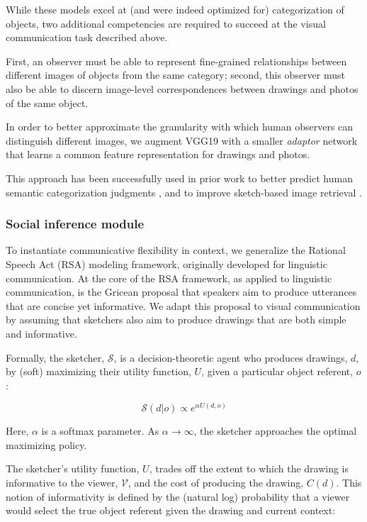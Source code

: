\documentclass[9pt,twocolumn,twoside]{pnas-new}
\begin{document}
While these models excel at (and were indeed optimized for) categorization of objects, two additional competencies are required to succeed at the visual communication task described above.

First, an observer must be able to represent fine-grained relationships between different images of objects from the same category; second, this observer must also be able to discern image-level correspondences between drawings and photos of the same object. 

In order to better approximate the granularity with which human observers can distinguish different images, we augment VGG19 with a smaller \textit{adaptor} network that learns a common feature representation for drawings and photos. 

This approach has been successfully used in prior work to better predict human semantic categorization judgments \cite{peterson2016adapting}, and to improve sketch-based image retrieval \cite[]{sangkloy2016sketchy}. 


\subsubsection*{Social inference module}

To instantiate communicative flexibility in context, we generalize the Rational Speech Act (RSA) modeling framework, originally developed for linguistic communication. At the core of the RSA framework, as applied to linguistic communication, is the Gricean proposal that speakers aim to produce utterances that are concise yet informative. We adapt this proposal to visual communication by assuming that sketchers also aim to produce drawings that are both simple and informative. 

Formally, the sketcher, $\mathcal{S}$, is a decision-theoretic agent who produces drawings, $d$, by (soft) maximizing their utility function, $U$, given a particular object referent, $o$: 

\begin{equation}
\mathcal{S}(d|o) \propto e^{\alpha U(d,o)}
\end{equation}

Here, $\alpha$ is a softmax parameter. As $\alpha \rightarrow \infty$, the sketcher approaches the optimal maximizing policy. 

The sketcher's utility function, $U$, trades off the extent to which the drawing is informative to the viewer, $\mathcal{V}$, and the cost of producing the drawing, $C(d)$. This notion of informativity is defined by the (natural log) probability that a viewer would select the true object referent given the drawing and current context:
\end{document}
